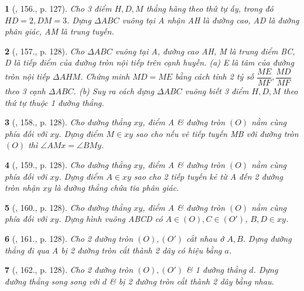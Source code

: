 \documentclass{article}
\newtheorem{baitoan}{}
\begin{document}
\begin{baitoan}[\cite{Binh_Toan_9_tap_1}, 156., p. 127]
	Cho 3 điểm $H,D,M$ thẳng hàng theo thứ tự ấy, trong đó $HD = 2,DM = 3$. Dựng $\Delta ABC$ vuông tại A nhận AH là đường cao, AD là đường phân giác, AM là trung tuyến.
\end{baitoan}

\begin{baitoan}[\cite{Binh_Toan_9_tap_1}, 157., p. 128]
	Cho $\Delta ABC$ vuông tại A, đường cao AH, M là trung điểm BC, D là tiếp điểm của đường tròn nội tiếp trên cạnh huyền. (a) E là tâm của đường tròn nội tiếp $\Delta AHM$. Chứng minh $MD = ME$ bằng cách tính 2 tỷ số $\dfrac{ME}{MF},\dfrac{MD}{MF}$ theo 3 cạnh $\Delta ABC$. (b) Suy ra cách dựng $\Delta ABC$ vuông biết 3 điểm $H,D,M$ theo thứ tự thuộc 1 đường thẳng.
\end{baitoan}

\begin{baitoan}[\cite{Binh_Toan_9_tap_1}, 158., p. 128]
	Cho đường thẳng $xy$, điểm A \& đường tròn $(O)$ nằm cùng phía đối với $xy$. Dựng điểm $M\in xy$ sao cho nếu vẽ tiếp tuyến MB với đường tròn $(O)$ thì $\angle{AMx} = \angle{BMy}$.
\end{baitoan}

\begin{baitoan}[\cite{Binh_Toan_9_tap_1}, 159., p. 128]
	Cho đường thẳng $xy$, điểm A \& đường tròn $(O)$ nằm cùng phía đối với $xy$. Dựng điểm $A\in xy$ sao cho 2 tiếp tuyến kẻ từ A đến 2 đường tròn nhận $xy$ là đường thẳng chứa tia phân giác.
\end{baitoan}

\begin{baitoan}[\cite{Binh_Toan_9_tap_1}, 160., p. 128]
	Cho đường thẳng $xy$, điểm A \& đường tròn $(O)$ nằm cùng phía đối với $xy$. Dựng hình vuông ABCD có $A\in(O),C\in(O')$, $B,D\in xy$.
\end{baitoan}

\begin{baitoan}[\cite{Binh_Toan_9_tap_1}, 161., p. 128]
	Cho 2 đường tròn $(O),(O')$ cắt nhau ở $A,B$. Dựng đường thẳng đi qua A bị 2 đường tròn cắt thành 2 dây có hiệu bằng $a$.
\end{baitoan}

\begin{baitoan}[\cite{Binh_Toan_9_tap_1}, 162., p. 128]
	Cho 2 đường tròn $(O),(O')$ \& 1 đường thẳng $d$. Dựng đường thẳng song song với $d$ \& bị 2 đường tròn cắt thành 2 dây bằng nhau.
\end{baitoan}
\end{document}
